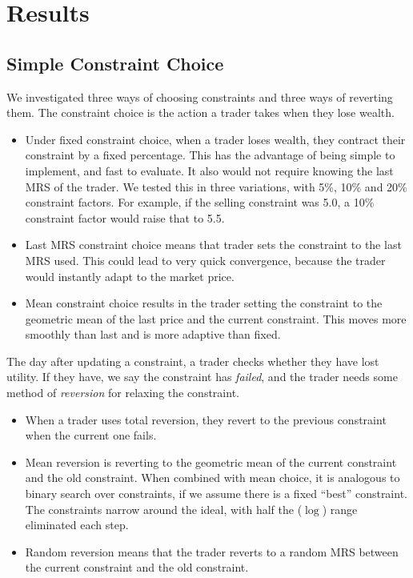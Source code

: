 \documentclass[12pt,a4paper,titlepage]{article}
\newcommand{\co}[1]{\textsf{#1}}
\begin{document}
\section{Results}\label{results}
\subsection{Simple Constraint Choice}
We investigated three ways of choosing constraints and three ways of reverting them.
The constraint choice is the action a trader takes when they lose wealth.

\begin{itemize}
  \item Under \co{fixed} constraint choice, when a trader loses wealth, they contract their constraint by a fixed percentage.
    This has the advantage of being simple to implement, and fast to evaluate.
    It also would not require knowing the last MRS of the trader.
    We tested this in three variations, with 5\%, 10\% and 20\% constraint factors.
    For example, if the selling constraint was 5.0, a 10\% constraint factor would raise that to 5.5.
    
  \item \co{Last} MRS constraint choice means that trader sets the constraint to the last MRS used.
    This could lead to very quick convergence, because the trader would instantly adapt to the market price.

  \item \co{Mean} constraint choice results in the trader setting the constraint to the geometric mean of the last price and the current constraint.
This moves more smoothly than \co{last} and is more adaptive than \co{fixed}.

\end{itemize}

The day after updating a constraint, a trader checks whether they have lost utility.
If they have, we say the constraint has \textit{failed}, and the trader needs some method of \textit{reversion} for relaxing the constraint.

\begin{itemize}

  \item When a trader uses \co{total} reversion, they revert to the previous constraint when the current one fails.

  \item \co{Mean} reversion is reverting to the geometric mean of the current constraint and the old constraint.
When combined with \co{mean} choice, it is analogous to binary search over constraints, if we assume there is a fixed ``best'' constraint.
The constraints narrow around the ideal, with half the ($\log$) range eliminated each step.

  \item \co{Random} reversion means that the trader reverts to a random MRS between the current constraint and the old constraint.

\end{itemize}
\end{document}
